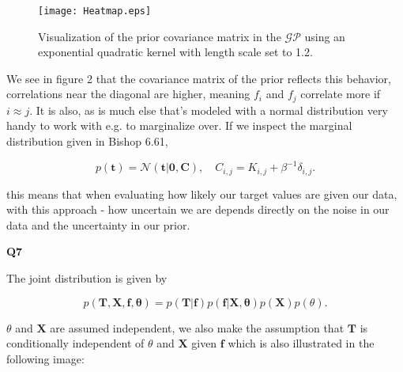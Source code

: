 \documentclass[a4paper]{article}
\begin{document}
\begin{figure}[H]
	\centering
	\texttt{[image: Heatmap.eps]}
	\caption{\label{fig:frog} Visualization of the prior covariance matrix in the $\mathcal{GP}$ using an exponential quadratic kernel with length scale set to 1.2.}
\end{figure}

\noindent We see in figure 2 that the covariance matrix of the prior reflects this behavior, correlations near the diagonal are higher, meaning $f_i$ and $f_j$ correlate more if $i\approx j$. It is also, as is much else that's modeled with a normal distribution very handy to work with e.g. to marginalize over. If we inspect the marginal distribution given in Bishop 6.61,

\begin{equation*}
p(\mathbf{t})=\mathcal{N}(\mathbf{t\vert 0}, \mathbf{C}), \quad C_{i,j}=K_{i,j}+\beta^{-1}\delta_{i,j}.
\end{equation*}

\noindent this means that when evaluating how likely our target values are given our data, with this approach - how uncertain we are depends directly on the noise in our data and the uncertainty in our prior.

\hfill

\noindent\textbf{Q7}

\noindent\makebox[\linewidth]{\rule{\textwidth}{0.4pt}}
\hfill

\noindent The joint distribution is given by

 \begin{equation*}
 p(\mathbf{T,X,f,\theta})=p(\mathbf{T\vert f})p(\mathbf{f\vert X,\theta})p(\mathbf{X})p(\theta).
 \end{equation*}

\noindent $\theta$ and $\mathbf{X}$ are assumed independent, we also make the assumption that $\mathbf{T}$ is conditionally independent of $\theta$ and $\mathbf{X}$ given $\mathbf{f}$ which is also illustrated in the following image:

\begin{figure}[H]
	\centering
\end{figure}
\end{document}
